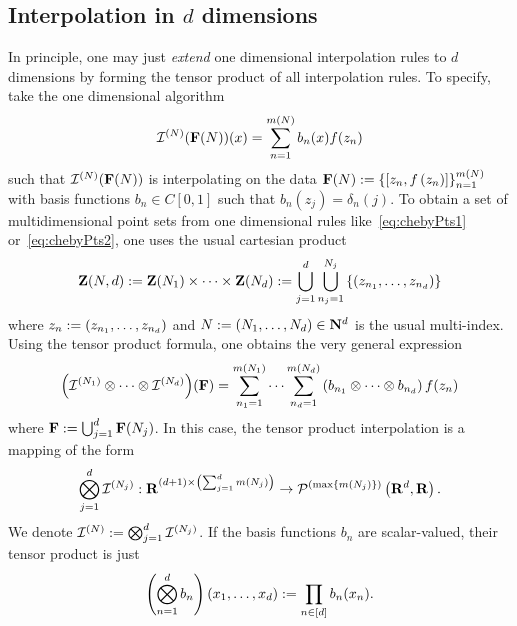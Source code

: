 \documentclass[12pt, oneside]{amsart}
\theoremstyle{definition}
\theoremstyle{remark}
\numberwithin{equation}{section}
\begin{document}
\subsection*{Interpolation in \(d\) dimensions} In principle, one may just \emph{extend} one dimensional interpolation rules to \(d\) dimensions by forming the tensor product of all interpolation rules. To specify, take the one dimensional algorithm
\begin{equation}\label{eq:general1dInterpolation}
    \cI^{(N)}(\FF(N))(x) = \sum_{n = 1}^{m(N)} b_{n}(x) f(z_n)
\end{equation}
such that \(\cI^{(N)}(\FF(N))\) is interpolating on the data \(\FF(N) \defn \set{\left[z_n, f\left(z_n\right)\right]}_{n=1}^{m(N)}\) with basis functions \(b_n \in C[0, 1]\) such that \(b_n(z_j) = \delta_n(j)\). To obtain a set of multidimensional point sets from one dimensional rules like\ \cref{eq:chebyPts1} or\ \cref{eq:chebyPts2}, one uses the usual cartesian product
\begin{equation}\label{eq:cartProduct}
    \ZZ(N, d) \defn \ZZ(N_1) \times \cdots \times \ZZ(N_d) \defn \bigcup_{j=1}^d \bigcup_{n_j=1}^{N_j} \set{\left(z_{n_1}, \dots, z_{n_d}\right)}
\end{equation}
where \(z_n \defn \left(z_{n_1}, \dots, z_{n_d}\right)\) and \(N \defn \left(N_1, \dots, N_d\right) \in \N^d\) is the usual multi-index. Using the tensor product formula, one obtains the very general expression
\begin{equation}\label{eq:tensorProdInterp}
    {\left( \cI^{(N_1)} \otimes \cdots \otimes \cI^{(N_d)} \right)}(\FF)
    = \sum_{n_1 = 1}^{m(N_1)} \cdots \sum_{n_d = 1}^{m(N_d)} \left( b_{n_1} \otimes \cdots \otimes b_{n_d} \right) f(z_{n})
\end{equation}
where \(\FF \defn \bigcup_{j=1}^d \FF(N_j)\). In this case, the tensor product interpolation is a mapping of the form
\begin{equation}\label{eq:tensorProdInterpMappingSpecification}
    \bigotimes_{j=1}^d \cI^{(N_j)}: \R^{(d+1) \times \left(\sum_{j=1}^d m(N_j) \right)} \to \pols[\left(\max \set{m(N_j)} \right)]{\R^d, \R}.
\end{equation}
We denote \(\cI^{(N)} \defn \bigotimes_{j=1}^d \cI^{(N_j)}\). If the basis functions \(b_n\) are scalar-valued, their tensor product is just
\begin{equation}\label{eq:tensorProdFunc}
    \left( \bigotimes_{n=1}^d b_n \right)(x_1, \dots, x_d) \defn \prod_{n \in [d]} b_n(x_n).
\end{equation}
\end{document}
